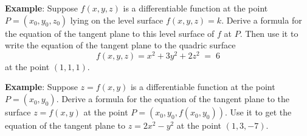 \documentclass[12pt,fleqn]{article}
\def\eg#1{{\bf Example}: #1}
\def\newt{\vspace{0.2in}\ni}
\begin{document}
\newt
\eg{}
Suppose $f(x,y,z)$ is a differentiable function at the point
$P = (x_0, y_0, z_0)$ lying on the level surface $f(x,y,z) = k$.
Derive a formula for the equation of the tangent plane to this
level surface of $f$ at $P$.  Then use it to write the equation
of the tangent plane to the quadric surface
$$ f(x,y,z) = x^2 + 3y^2 + 2z^2 \;=\; 6 $$
at the point $(1,1,1)$.

\vspace{3in}
\ni
\eg{}
Suppose $z = f(x,y)$ is a differentiable function at the point
$P = (x_0, y_0)$.  Derive a formula for the equation of the tangent
plane to the surface $z = f(x,y)$ at the point
$P = (x_0, y_0, f(x_0,y_0))$.  Use it to get the equation of
the tangent plane to $z = 2x^2 - y^2$ at the point $(1, 3, -7)$.
\end{document}
